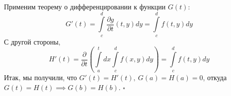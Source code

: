 Применим теорему о дифференцировании к функции $G(t)$: 
$$G'(t)=\int\limits_{c}^{d} \frac{\partial g}{\partial t}(t,y)dy=
\int\limits_{c}^{d}f(t,y)dy$$
С другой стороны,
$$H'(t)=\frac{\partial}{\partial t}\left( \int\limits_{a}^{t}dx
\int\limits_{c}^{d}f(x,y)dy \right)=\int\limits_{c}^{d}f(t,y)dy$$
Итак, мы получили, что $G'(t)=H'(t),~G(a)=H(a)=0$, откуда
$G(t)=H(t)\implies G(b)=H(b)$. $\square$ \\












